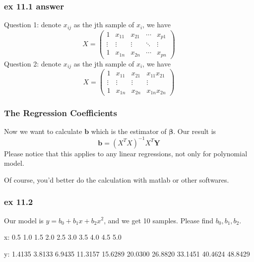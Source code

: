 \documentclass{beamer}
\begin{document}
\begin{frame}
    \frametitle{ex 11.1 answer}
    Question 1: denote $x_{ij}$ as the jth sample of $x_i$, we have
    \begin{equation*}
        X=
        \left(
        \begin{array}{ccccc}
            1 & x_{11} & x_{21} & \cdots & x_{p1}\\
            \vdots & \vdots & \vdots & \ddots & \vdots\\
            1 & x_{1n} & x_{2n} & \cdots & x_{pn}
        \end{array}
        \right)
    \end{equation*}
    Question 2: denote $x_{ij}$ as the jth sample of $x_i$, we have
    \begin{equation*}
        X=
        \left(
        \begin{array}{ccccc}
            1 & x_{11} & x_{21}  & x_{11}x_{21}\\
            \vdots & \vdots & \vdots  & \vdots\\
            1 & x_{1n} & x_{2n}  & x_{1n}x_{2n}
        \end{array}
        \right)
    \end{equation*}

\end{frame}

\begin{frame}
    \frametitle{The Regression Coefficients}

    Now we want to calculate $\mathbf{b}$ which is the estimator of $\boldsymbol{\beta}$. Our result is
    \[\mathbf{b}=(X^{T}X)^{-1}X^{T}\mathbf{Y}\]
    Please notice that this applies to any linear regressions, not only for polynomial model.\par
    Of course, you'd better do the calculation with matlab or other softwares.

\end{frame}



\begin{frame}
    \frametitle{ex 11.2}

    Our model is $y=b_0+b_1 x+b_2 x^2$, and we get 10 samples. Please find $b_0, b_1, b_2$.\par
    x: 0.5    1.0    1.5    2.0    2.5    3.0    3.5    4.0    4.5    5.0\par
    y: 1.4135    3.8133    6.9435   11.3157   15.6289   20.0300   26.8820   33.1451   40.4624   48.8429

\end{frame}
\end{document}
